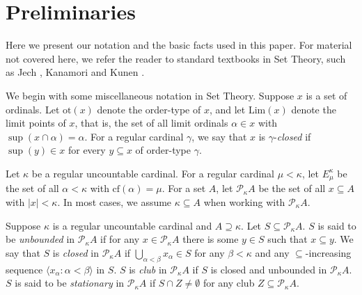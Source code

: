 \documentclass[a4paper,12pt,reqno,oneside]{amsart}
\theoremstyle{plain}
\newcommand{\cof}{\mathrm{cf}}
\newcommand{\otp}{\mathrm{ot}}
\newcommand{\mcal}{\mathcal}
\newcommand{\ltpt}{\mathrm{Lim}}
\begin{document}
\section{Preliminaries} \label{sec:preliminaries}

Here we present our notation and the basic facts used in this paper. For material not covered here, we refer the reader to standard textbooks in Set Theory, such as Jech \cite{Je}, Kanamori \cite{K} and Kunen \cite{Ku}. 

We begin with some miscellaneous notation in Set Theory. Suppose $x$ is a set of ordinals. Let $\otp (x)$ denote the order-type of $x$, and let $\ltpt (x)$ denote the limit points of $x$, that is, the set of all limit ordinals $\alpha \in x$ with $\sup ( x \cap \alpha ) = \alpha$. For a regular cardinal $\gamma$, we say that $x$ is $\gamma$-\emph{closed} if $\sup(y) \in x$ for every $y \subseteq x$ of order-type $\gamma$.

Let $\kappa$ be a regular uncountable cardinal. For a regular cardinal $\mu < \kappa$, let $E^\kappa_\mu$ be the set of all $\alpha < \kappa$ with $\cof ( \alpha ) = \mu$. For a set $A$, let $\mcal{P}_\kappa A$ be the set of all $x \subseteq A$ with $|x| < \kappa$. In most cases, we assume $\kappa \subseteq A$ when working with $\mcal{P}_\kappa A$.

Suppose $\kappa$ is a regular uncountable cardinal and $A \supseteq \kappa$. Let $S \subseteq \mcal{P}_\kappa A$. $S$ is said to be \emph{unbounded} in $\mcal{P}_{\kappa} A$ if for any $x \in \mcal{P}_{\kappa}{A}$ there is some $y \in S$ such that $x \subseteq y$. We say that $S$ is \emph{closed} in $\mcal{P}_{\kappa}{A}$ if $\bigcup_{\alpha < \beta} x_\alpha \in S$ for any $\beta < \kappa$ and any $\subseteq$-increasing sequence  $\langle x_\alpha  : \alpha < \beta \rangle$ in $S$. $S$ is \emph{club} in $\mcal{P}_{\kappa}{A}$ if $S$ is closed and unbounded in $\mcal{P}_{\kappa}{A}$. $S$ is said to be \emph{stationary} in $\mcal{P}_{\kappa}{A}$ if $S \cap Z \neq \emptyset$ for any club $Z \subseteq \mcal{P}_{\kappa}{A}$.
\end{document}
